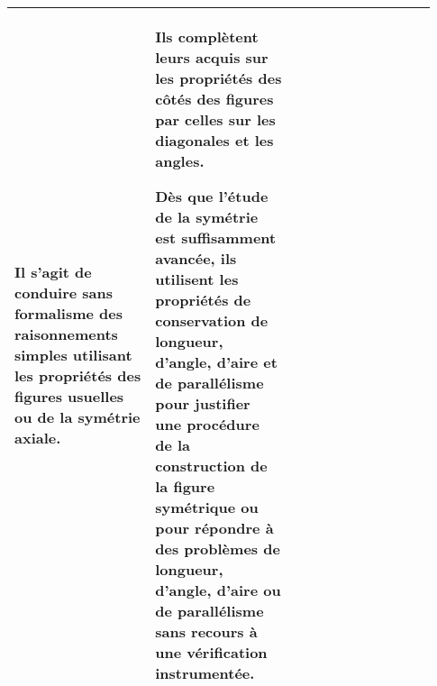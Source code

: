 {\begin{tabular}{|p{0.31\linewidth}|p{0.31\linewidth}|p{0.31\linewidth}|}
Il s'agit de conduire sans formalisme des raisonnements simples utilisant les propriétés des figures usuelles ou de la symétrie axiale.
&
Ils complètent leurs acquis sur les propriétés des côtés des figures par celles sur les diagonales et les angles.\par 
Dès que l’étude de la symétrie est suffisamment avancée, ils utilisent les propriétés de conservation
de longueur, d’angle, d’aire et de parallélisme pour justifier une procédure de la construction de la
figure symétrique ou pour répondre à des problèmes de longueur, d’angle, d’aire ou de
parallélisme sans recours à une vérification instrumentée.
\\ 
\hline
\end{tabular}
\renewcommand{\arraystretch}{1}
}